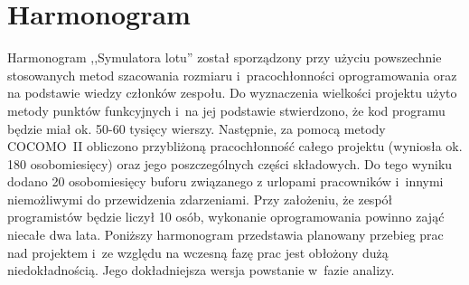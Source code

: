 \documentclass{mwrep}
\begin{document}
\chapter{Harmonogram}
Harmonogram ,,Symulatora lotu'' został sporządzony przy użyciu powszechnie stosowanych metod szacowania rozmiaru i~pracochłonności oprogramowania oraz na podstawie wiedzy członków zespołu. Do wyznaczenia wielkości projektu użyto metody punktów funkcyjnych i~na jej podstawie stwierdzono, że kod programu będzie miał ok. 50-60 tysięcy wierszy. Następnie, za pomocą metody COCOMO~II obliczono przybliżoną pracochłonność całego projektu (wyniosła ok. 180 osobomiesięcy) oraz jego poszczególnych części składowych. Do tego wyniku dodano 20 osobomiesięcy buforu związanego z urlopami pracowników i~innymi niemożliwymi do przewidzenia zdarzeniami. Przy założeniu, że zespół programistów będzie liczył 10 osób, wykonanie oprogramowania powinno zająć niecałe dwa lata.
Poniższy harmonogram przedstawia planowany przebieg prac nad projektem i~ze względu na wczesną fazę prac jest obłożony dużą niedokładnością. Jego dokładniejsza wersja powstanie w~fazie analizy.
\end{document}
